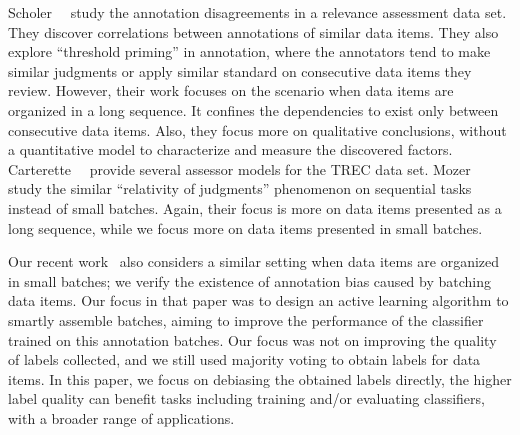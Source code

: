 Scholer~\etal~\cite{scholer:sigir2013,scholer:sigir2011} study the annotation disagreements in 
a relevance assessment data set.  
They discover correlations between annotations of similar data items.  %
They also explore ``threshold priming'' in annotation, 
where the annotators tend to make similar judgments or apply similar standard on consecutive data items they review. 
However, their work focuses on the scenario when data items are organized in a long sequence.  
It confines the dependencies to exist only between consecutive data items.  
Also, they focus more on qualitative conclusions, without a quantitative model to characterize and measure the discovered factors.  
Carterette~\etal~\cite{carterette:effect2010} provide several assessor models for the TREC data set.  
Mozer~\etal~\cite{mozer:nips2010} study the similar ``relativity of
judgments'' phenomenon on sequential tasks instead of small batches.  
Again, their focus is more on data items presented as a long sequence, while we focus more on data items presented in small batches.  

Our recent work~\cite{zhuang:wsdm2015} also considers a similar setting when data items are organized in small batches; we verify the existence of annotation bias caused by batching data items.  
Our focus in that paper was to design an active learning algorithm to smartly assemble batches, 
aiming to improve the performance of the classifier trained on this annotation batches.  
Our focus was not on improving the quality of labels collected, 
and we still used majority voting to obtain labels for data items.  
In this paper, we focus on debiasing the obtained labels directly,
the higher label quality can benefit tasks including training and/or evaluating classifiers, 
with a broader range of applications.

